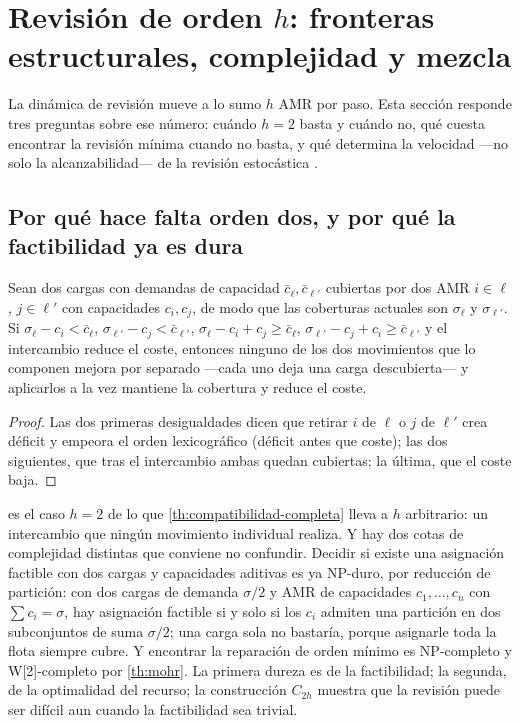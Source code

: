 \section{Revisión de orden $h$: fronteras estructurales, complejidad y mezcla}
\label{sec:cfrd}

La dinámica de revisión mueve a lo sumo $h$ AMR por paso. Esta sección
responde tres preguntas sobre ese número: cuándo $h=2$ basta y cuándo no,
qué cuesta encontrar la revisión mínima cuando no basta, y qué determina la
velocidad —no solo la alcanzabilidad— de la revisión estocástica
\cite{mayorga2026compendio}.

\subsection{Por qué hace falta orden dos, y por qué la factibilidad ya es dura}

\begin{lema}
\label{le:barrera-unilateral}
Sean dos cargas con demandas de capacidad $\bar c_\ell,\bar c_{\ell'}$
cubiertas por dos AMR $i\in\ell$, $j\in\ell'$ con capacidades $c_i,c_j$, de
modo que las coberturas actuales son $\sigma_\ell$ y $\sigma_{\ell'}$. Si
$\sigma_\ell-c_i<\bar c_\ell$, $\sigma_{\ell'}-c_j<\bar c_{\ell'}$,
$\sigma_\ell-c_i+c_j\ge\bar c_\ell$, $\sigma_{\ell'}-c_j+c_i\ge\bar c_{\ell'}$
y el intercambio reduce el coste, entonces ninguno de los dos movimientos que
lo componen mejora por separado —cada uno deja una carga descubierta— y
aplicarlos a la vez mantiene la cobertura y reduce el coste.
\end{lema}

\begin{proof}
Las dos primeras desigualdades dicen que retirar $i$ de $\ell$ o $j$ de
$\ell'$ crea déficit y empeora el orden lexicográfico (déficit antes que
coste); las dos siguientes, que tras el intercambio ambas quedan cubiertas;
la última, que el coste baja.
\end{proof}

\begin{observacion}
\label{obs:escalera-ordenes}
 es el caso $h=2$ de lo que
\cref{th:compatibilidad-completa} lleva a $h$ arbitrario: un intercambio que
ningún movimiento individual realiza. Y hay dos cotas de complejidad
distintas que conviene no confundir. Decidir si existe una asignación
factible con dos cargas y capacidades aditivas es ya NP-duro, por reducción
de partición: con dos cargas de demanda $\sigma/2$ y AMR de capacidades
$c_1,\dots,c_n$ con $\sum c_i=\sigma$, hay asignación factible si y solo si
los $c_i$ admiten una partición en dos subconjuntos de suma $\sigma/2$; una
carga sola no bastaría, porque asignarle toda la flota siempre cubre. Y
encontrar la reparación de orden mínimo es NP-completo y W[2]-completo por
\cref{th:mohr}. La primera dureza es de la factibilidad; la segunda, de la
optimalidad del recurso; la construcción $C_{2h}$ muestra que la revisión
puede ser difícil aun cuando la factibilidad sea trivial.
\end{observacion}

